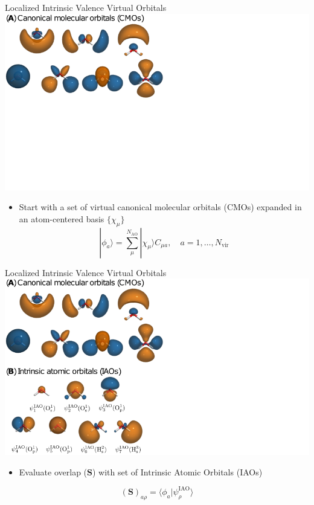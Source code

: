 \documentclass[t]{beamer}
\begin{document}
\begin{frame}{Localized Intrinsic Valence Virtual Orbitals}
\centering
\includegraphics[width=0.75\linewidth]{livvo_procedure_1.png}
\begin{itemize}
\item Start with a set of virtual canonical molecular orbitals (CMOs) expanded in an atom-centered basis $\{\chi_{\mu}\}$
\begin{equation}
|\phi_a\rangle = \sum_{\mu}^{N_\mathrm{AO}} |\chi_{\mu} \rangle C_{\mu a}, \quad a = 1,\ldots,N_\mathrm{vir}
\end{equation}
\end{itemize}
\end{frame}

\begin{frame}{Localized Intrinsic Valence Virtual Orbitals}
\centering
\includegraphics[width=0.75\linewidth]{livvo_procedure_2.png}
\begin{itemize}
\item Evaluate overlap ($\mathbf{S}$) with set of Intrinsic Atomic Orbitals (IAOs) 
\end{itemize}
\begin{equation}
(\mathbf{S})_{a\rho} = \langle \phi_a | \psi_{\rho}^\mathrm{IAO} \rangle
\end{equation}
\end{frame}
\end{document}
